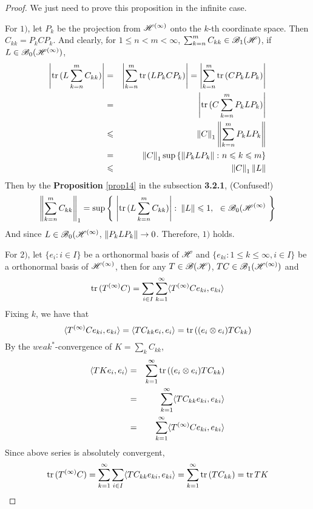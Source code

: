 \begin{proof}
	We just need to prove this proposition in the infinite case.
	\item For $1)$, let $P_k$ be the projection from $\mathscr{H}^{(\infty)}$ onto the $k$-th coordinate space. Then $C_{kk} = P_k C P_k$. And clearly, for $1 \leqslant n < m < \infty$, $\sum_{k=n}^{m}C_{kk} \in \mathscr{B}_{1}\mathscr{(H)}$, if $L \in \mathscr{B}_0(\mathscr{H}^{(\infty)})$,
	\begin{eqnarray*}
		\left\lvert\operatorname{tr}{(L \sum_{k=n}^{m}C_{kk})}\right\lvert &=& \left\lvert\sum_{k=n}^{m} \operatorname{tr}{(LP_kCP_k)}\right\lvert = \left\lvert\sum_{k=n}^{m} \operatorname{tr}{(CP_kLP_k)}\right\lvert \\
		&=& \left\lvert\operatorname{tr}{(C \sum_{k=n}^{m} P_kLP_k)}\right\lvert \\
		&\leqslant& \left\lVert C\right\lVert_1 \left\lVert\sum_{k=n}^{m} P_kLP_k\right\lVert \\
		&=& \left\lVert C\right\lVert_1 \sup{\{\left\lVert P_kLP_k\right\lVert \colon n \leqslant k \leqslant m\}} \\
		&\leqslant& \left\lVert C\right\lVert_1 \left\lVert L\right\lVert
	\end{eqnarray*}
	Then by the \textbf{Proposition} \ref{prop14} in the subsection \textbf{3.2.1}, (Confused!)
	\begin{equation*}
		\left\lVert\sum_{k=n}^{m}C_{kk}\right\lVert_1 = \sup{\left\{~\left\lvert\operatorname{tr}{(L\sum_{k=n}^{m}C_{kk})}\right\lvert \colon \left\lVert L\right\lVert \leqslant 1,~ \ \in \mathscr{B}_0(\mathscr{H}^{(\infty)}~\right\}}
	\end{equation*}
	And since $L \in \mathscr{B}_0(\mathscr{H}^{(\infty)}$, $\left\lVert P_kLP_k\right\lVert \rightarrow 0$. Therefore, $1)$ holds.
	\item For $2)$, let $\{e_i \colon i \in I\}$ be a orthonormal basis of $\mathscr{H}$ and $\{e_{ki} \colon 1 \leqslant k \leqslant \infty, i \in I\}$ be a orthonormal basis of $\mathscr{H}^{(\infty)}$, then for any $T \in \mathscr{B}(\mathscr{H})$, $TC \in \mathscr{B}_1(\mathscr{H}^{(\infty)})$ and
	\begin{equation*}
		\operatorname{tr}{(T^{(\infty)}C)} = \sum_{i \in I} \sum_{k=1}^{\infty} \langle T^{(\infty)}C e_{ki},e_{ki} \rangle
	\end{equation*}
	Fixing $k$, we have that
	\begin{equation*}
		\langle T^{(\infty)}Ce_{ki},e_{ki} \rangle = \langle TC_{kk}e_{i},e_{i} \rangle = \operatorname{tr}{((e_i \otimes e_i)TC_{kk})}
	\end{equation*}
	By the $weak^{*}$-convergence of $K = \sum_{k} C_{kk}$, 
	\begin{eqnarray*}
		\langle TKe_i,e_i \rangle &=& \sum_{k=1}^{\infty} \operatorname{tr}{((e_i \otimes e_i)TC_{kk})} \\
		&=& \sum_{k=1}^{\infty} \langle TC_{kk}e_{ki},e_{ki} \rangle \\
		&=& \sum_{k=1}^{\infty} \langle T^{(\infty)}Ce_{ki},e_{ki} \rangle
	\end{eqnarray*}
	Since above series is absolutely convergent, 
	\begin{equation*}
		\operatorname{tr}{(T^{(\infty)}C)} = \sum_{k=1}^{\infty} \sum_{i \in I} \langle TC_{kk}e_{ki},e_{ki} \rangle = \sum_{k=1}^{\infty} \operatorname{tr}{(TC_{kk})} = \operatorname{tr}{TK}
	\end{equation*}
\end{proof}

